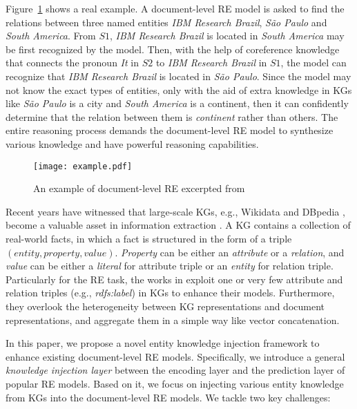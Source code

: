 \documentclass[runningheads]{llncs}
\begin{document}
Figure~\ref{fig:example} shows a real example. 
A document-level RE model is asked to find the relations between three named entities \textit{IBM Research Brazil}, \textit{S\~{a}o Paulo} and \textit{South America}. 
From $S1$, \textit{IBM Research Brazil} is located in \textit{South America} may be first recognized by the model. 
Then, with the help of coreference knowledge that connects the pronoun \textit{It} in $S2$ to \textit{IBM Research Brazil} in $S1$, the model can recognize that \textit{IBM Research Brazil} is located in \textit{S\~{a}o Paulo}. 
Since the model may not know the exact types of entities, only with the aid of extra knowledge in KGs like \textit{S\~{a}o Paulo} is a city and \textit{South America} is a continent, then it can confidently determine that the relation between them is \textit{continent} rather than others. 
The entire reasoning process demands the document-level RE model to synthesize various knowledge and have powerful reasoning capabilities. 

\begin{figure}[!tb]
	\centering
	\texttt{[image: example.pdf]}
	\caption{An example of document-level RE excerpted from \cite{yao2019docred}}
	\label{fig:example}
\end{figure}

Recent years have witnessed that large-scale KGs, e.g., Wikidata
\cite{vrandevcic2014wikidata} and DBpedia \cite{auer2007dbpedia}, become a valuable asset in information extraction \cite{bastos2021recon,fernandez2020enhancing,pan2019entity,tong2020improving,turker2020weakly,vashishth2018reside,verlinden2021injecting}. 
A KG contains a collection of real-world facts, in which a fact is structured in the form of a triple $(\textit{entity}, \textit{property}, \textit{value})$. 
\textit{Property} can be either an \textit{attribute} or a \textit{relation}, and \textit{value} can be either a \textit{literal} for attribute triple or an \textit{entity} for relation triple.
Particularly for the RE task, the works in \cite{bastos2021recon,ji2017distant,vashishth2018reside,verlinden2021injecting} exploit one or very few attribute and relation triples (e.g., \textit{rdfs:label}) in KGs to enhance their models.
Furthermore, they overlook the heterogeneity between KG representations and document representations, and aggregate them in a simple way like vector concatenation.

In this paper, we propose a novel entity knowledge injection framework to enhance existing document-level RE models.
Specifically, we introduce a general \emph{knowledge injection layer} between the encoding layer and the prediction layer of popular RE models.  
Based on it, we focus on injecting various entity knowledge from KGs into the document-level RE models. 
We tackle two key challenges:
\end{document}
